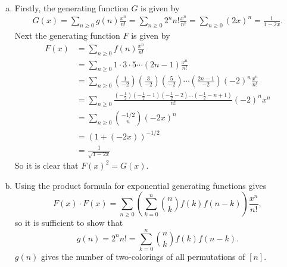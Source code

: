 \documentclass{article}
\newenvironment{solution}[1][Solution.]{\begin{trivlist}
\item[\hskip \labelsep {\bfseries #1}]}{\end{trivlist}}
\begin{document}
\begin{solution} \text{} \\
  \begin{enumerate}[(a)]
    \item
      Firstly, the generating function $G$ is given by \begin{align*}
        G(x)
        = \sum_{n\geq0}g(n)\frac{x^n}{n!}
        = \sum_{n\geq0} 2^nn!\frac{x^n}{n!}
        = \sum_{n\geq0} (2x)^n
        = \frac{1}{1-2x}.
      \end{align*}
      Next the generating function $F$ is given by \begin{align*}
        F(x) &= \sum_{n\geq0} f(n)\frac{x^n}{n!} \\
        &= \sum_{n\geq0} 1 \cdot 3 \cdot 5 \cdots (2n-1)\frac{x^n}{n!} \\
        &= \sum_{n\geq0}
          \left(\frac1{-2}\right)
          \left(\frac{3}{-2}\right)
          \left(\frac{5}{-2}\right)
          \cdots
          \left(\frac{2n-1}{-2}\right)
          (-2)^n\frac{x^n}{n!} \\
        &= \sum_{n\geq0}\frac{(-\frac12)(-\frac12-1)(-\frac12-2)\hdots(-\frac12 - n + 1)}{n!}(-2)^nx^n \\
        &= \sum_{n\geq0}\binom{-1/2}{n}(-2x)^n \\
        &= (1 + (-2x))^{-1/2} \\
        &= \frac{1}{\sqrt{1 - 2x}}
      \end{align*}
      So it is clear that $F(x)^2 = G(x)$.
    \item
      Using the product formula for exponential generating functions gives \[
        F(x) \cdot F(x) = \sum_{n \geq 0}\left(\sum_{k=0}^n\binom{n}{k}f(k)f(n-k)\right)\frac{x^n}{n!},
      \] so it is sufficient to show that \[
        g(n) = 2^nn! = \sum_{k=0}^n\binom{n}{k}f(k)f(n-k).
      \]
      $g(n)$ gives the number of two-colorings of all permutations of $[n]$.
  \end{enumerate}
\end{solution}
\end{document}
